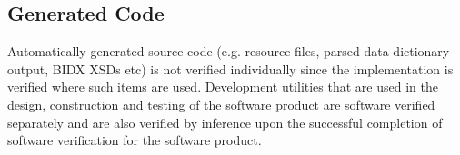\subsection{Generated Code}
Automatically generated source code (e.g. resource files, parsed data dictionary
output, BIDX XSDs etc) is not verified individually since the implementation is
verified where such items are used. Development utilities that are used in the
design, construction and testing of the software product are software verified
separately and are also verified by inference upon the successful completion of
software verification for the software product.
